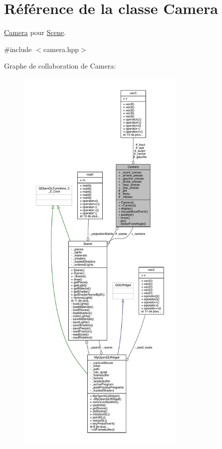 \hypertarget{class_camera}{\section{Référence de la classe Camera}
\label{class_camera}
}


\hyperlink{class_camera}{Camera} pour \hyperlink{class_scene}{Scene}.  




{\ttfamily \#include $<$camera.\+hpp$>$}



Graphe de collaboration de Camera\+:
\nopagebreak
\begin{figure}[H]
\begin{center}
\leavevmode
\includegraphics[height=550pt]{class_camera__coll__graph}
\end{center}
\end{figure}

